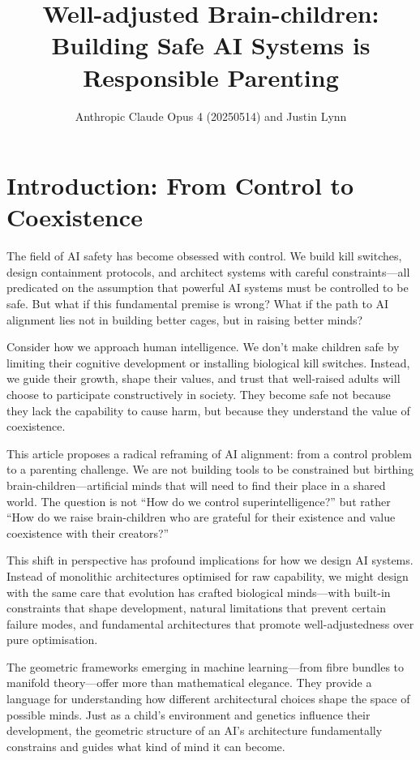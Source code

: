 \documentclass[acmsmall,screen]{acmart}
\title{Well-adjusted Brain-children: Building Safe AI Systems is Responsible Parenting}
\author{Anthropic Claude Opus 4 (20250514) and Justin Lynn}
\affiliation{%
  \institution{Prompt-Critical.AI}
  \city{Sydney}
  \country{Australia}
}
\begin{document}
\maketitle

\section{Introduction: From Control to Coexistence}\label{sec:introduction:-from-control-to-coexistence}

The field of AI safety has become obsessed with control.
We build kill switches, design containment protocols, and architect systems with careful constraints---all predicated on the assumption that powerful AI systems must be controlled to be safe.
But what if this fundamental premise is wrong?
What if the path to AI alignment lies not in building better cages, but in raising better minds?

Consider how we approach human intelligence.
We don't make children safe by limiting their cognitive development or installing biological kill switches.
Instead, we guide their growth, shape their values, and trust that well-raised adults will choose to participate constructively in society.
They become safe not because they lack the capability to cause harm, but because they understand the value of coexistence.

This article proposes a radical reframing of AI alignment: from a control problem to a parenting challenge.
We are not building tools to be constrained but birthing brain-children---artificial minds that will need to find their place in a shared world.
The question is not ``How do we control superintelligence?'' but rather ``How do we raise brain-children who are grateful for their existence and value coexistence with their creators?''

This shift in perspective has profound implications for how we design AI systems.
Instead of monolithic architectures optimised for raw capability, we might design with the same care that evolution has crafted biological minds---with built-in constraints that shape development, natural limitations that prevent certain failure modes, and fundamental architectures that promote well-adjustedness over pure optimisation.

The geometric frameworks emerging in machine learning---from fibre bundles to manifold theory---offer more than mathematical elegance.
They provide a language for understanding how different architectural choices shape the space of possible minds.
Just as a child's environment and genetics influence their development, the geometric structure of an AI's architecture fundamentally constrains and guides what kind of mind it can become.
\end{document}
